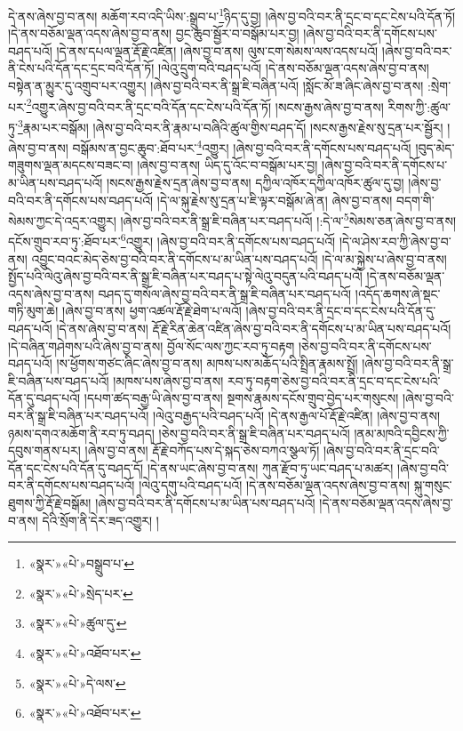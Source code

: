 དེ་ནས་ཞེས་བྱ་བ་ནས། མཆོག་རབ་འདི་ཡིས་:སྒྲུབ་པ་\footnote{«སྣར་»«པེ་»བསྒྲུབ་པ་}ཉིད་དུ་བྱ། །ཞེས་བྱ་བའི་བར་ནི་དྲང་བ་དང་ངེས་པའི་དོན་ཏོ། །དེ་ནས་བཅོམ་ལྡན་འདས་ཞེས་བྱ་བ་ནས། བྱང་ཆུབ་སྦྱོར་བ་བསྒོམ་པར་བྱ། །ཞེས་བྱ་བའི་བར་ནི་དགོངས་པས་བཤད་པའོ། །དེ་ནས་དཔལ་ལྡན་རྡོ་རྗེ་འཛིན། །ཞེས་བྱ་བ་ནས། ལུས་ངག་སེམས་ལས་འདས་པའོ། །ཞེས་བྱ་བའི་བར་ནི་ངེས་པའི་དོན་དང་དྲང་བའི་དོན་ཏོ། །ལེའུ་དྲུག་བའི་བཤད་པའོ། །དེ་ནས་བཅོམ་ལྡན་འདས་ཞེས་བྱ་བ་ནས། བསྟེན་ན་མྱུར་དུ་འགྲུབ་པར་འགྱུར། །ཞེས་བྱ་བའི་བར་ནི་སྒྲ་ཇི་བཞིན་པའོ། །སློང་མོ་ཟ་ཞིང་ཞེས་བྱ་བ་ནས། :སྲེག་པར་\footnote{«སྣར་»«པེ་»སྲེད་པར་}འགྱུར་ཞེས་བྱ་བའི་བར་ནི་དྲང་བའི་དོན་དང་ངེས་པའི་དོན་ཏོ། །སངས་རྒྱས་ཞེས་བྱ་བ་ནས། རིགས་ཀྱི་:ཚུལ་ཏུ་\footnote{«སྣར་»«པེ་»ཚུལ་དུ་}རྣམ་པར་བསྒོམ། །ཞེས་བྱ་བའི་བར་ནི་རྣམ་པ་བཞིའི་ཚུལ་གྱིས་བཤད་དོ། །སངས་རྒྱས་རྗེས་སུ་དྲན་པར་སྦྱོར། །ཞེས་བྱ་བ་ནས། བསྒོམས་ན་བྱང་ཆུབ་:ཐོབ་པར་\footnote{«སྣར་»«པེ་»འཐོབ་པར་}འགྱུར། །ཞེས་བྱ་བའི་བར་ནི་དགོངས་པས་བཤད་པའོ། །བུད་མེད་གཟུགས་ལྡན་མདངས་བཟང་བ། །ཞེས་བྱ་བ་ནས། ཡིད་དུ་འོང་བ་བསྒོམ་པར་བྱ། །ཞེས་བྱ་བའི་བར་ནི་དགོངས་པ་མ་ཡིན་པས་བཤད་པའོ། །སངས་རྒྱས་རྗེས་དྲན་ཞེས་བྱ་བ་ནས། དཀྱིལ་འཁོར་དཀྱིལ་འཁོར་ཚུལ་དུ་བྱ། །ཞེས་བྱ་བའི་བར་ནི་དགོངས་པས་བཤད་པའོ། །དེ་ལ་སྐུ་རྗེས་སུ་དྲན་པ་ཇི་ལྟར་བསྒོམ་ཞེ་ན། ཞེས་བྱ་བ་ནས། བདག་གི་སེམས་ཀྱང་དེ་འདྲར་འགྱུར། །ཞེས་བྱ་བའི་བར་ནི་སྒྲ་ཇི་བཞིན་པར་བཤད་པའོ། །:དེ་ལ་\footnote{«སྣར་»«པེ་»དེ་ལས་}སེམས་ཅན་ཞེས་བྱ་བ་ནས། དངོས་གྲུབ་རབ་ཏུ་:ཐོབ་པར་\footnote{«སྣར་»«པེ་»འཐོབ་པར་}འགྱུར། །ཞེས་བྱ་བའི་བར་ནི་དགོངས་པས་བཤད་པའོ། །དེ་ལ་ཤེས་རབ་ཀྱི་ཞེས་བྱ་བ་ནས། འབྱུང་བའང་མེད་ཅེས་བྱ་བའི་བར་ནི་དགོངས་པ་མ་ཡིན་པས་བཤད་པའོ། །དེ་ལ་མ་སྐྱེས་པ་ཞེས་བྱ་བ་ནས། སྤྱོད་པའི་ལེའུ་ཞེས་བྱ་བའི་བར་ནི་སྒྲ་ཇི་བཞིན་པར་བཤད་པ་སྟེ་ལེའུ་བདུན་པའི་བཤད་པའོ། །དེ་ནས་བཅོམ་ལྡན་འདས་ཞེས་བྱ་བ་ནས། བཤད་དུ་གསོལ་ཞེས་བྱ་བའི་བར་ནི་སྒྲ་ཇི་བཞིན་པར་བཤད་པའོ། །འདོད་ཆགས་ཞེ་སྡང་གཏི་མུག་ཆེ། །ཞེས་བྱ་བ་ནས། ཕྱག་འཚལ་རྡོ་རྗེ་ཐེག་པ་ལའོ། །ཞེས་བྱ་བའི་བར་ནི་དྲང་བ་དང་ངེས་པའི་དོན་དུ་བཤད་པའོ། །དེ་ནས་ཞེས་བྱ་བ་ནས། རྡོ་རྗེ་རིན་ཆེན་འཛིན་ཞེས་བྱ་བའི་བར་ནི་དགོངས་པ་མ་ཡིན་པས་བཤད་པའོ། །དེ་བཞིན་གཤེགས་པའི་ཞེས་བྱ་བ་ནས། བྱོལ་སོང་ལས་ཀྱང་རབ་ཏུ་བརྟག །ཅེས་བྱ་བའི་བར་ནི་དགོངས་པས་བཤད་པའོ། །ས་ཕྱོགས་གཙང་ཞིང་ཞེས་བྱ་བ་ནས། མཁས་པས་མཆོད་པའི་སྤྲིན་རྣམས་སྤྲོ། །ཞེས་བྱ་བའི་བར་ནི་སྒྲ་ཇི་བཞིན་པས་བཤད་པའོ། །མཁས་པས་ཞེས་བྱ་བ་ནས། རབ་ཏུ་བརྟག་ཅེས་བྱ་བའི་བར་ནི་དྲང་བ་དང་ངེས་པའི་དོན་དུ་བཤད་པའོ། །དཔག་ཚད་བརྒྱ་ཡི་ཞེས་བྱ་བ་ནས། སྔགས་རྣམས་དངོས་གྲུབ་བྱེད་པར་གསུངས། །ཞེས་བྱ་བའི་བར་ནི་སྒྲ་ཇི་བཞིན་པར་བཤད་པའོ། །ལེའུ་བརྒྱད་པའི་བཤད་པའོ། །དེ་ནས་རྒྱལ་པོ་རྡོ་རྗེ་འཛིན། །ཞེས་བྱ་བ་ནས། ཉམས་དགའ་མཆོག་ནི་རབ་ཏུ་བཤད། །ཅེས་བྱ་བའི་བར་ནི་སྒྲ་ཇི་བཞིན་པར་བཤད་པའོ། །ནམ་མཁའི་དབྱིངས་ཀྱི་དབུས་གནས་པར། །ཞེས་བྱ་བ་ནས། རྡོ་རྗེ་བཀོད་པས་དེ་སྐད་ཅེས་བཀའ་སྩལ་ཏོ། །ཞེས་བྱ་བའི་བར་ནི་དྲང་བའི་དོན་དང་ངེས་པའི་དོན་དུ་བཤད་དོ། །དེ་ནས་ཡང་ཞེས་བྱ་བ་ནས། ཀུན་རྫོབ་ཏུ་ཡང་བཤད་པ་མཚར། །ཞེས་བྱ་བའི་བར་ནི་དགོངས་པས་བཤད་པའོ། །ལེའུ་དགུ་པའི་བཤད་པའོ། །དེ་ནས་བཅོམ་ལྡན་འདས་ཞེས་བྱ་བ་ནས། སྐུ་གསུང་ཐུགས་ཀྱི་རྡོ་རྗེ་བསྒོམ། །ཞེས་བྱ་བའི་བར་ནི་དགོངས་པ་མ་ཡིན་པས་བཤད་པའོ། །དེ་ནས་བཅོམ་ལྡན་འདས་ཞེས་བྱ་བ་ནས། དེའི་སྲོག་ནི་དེར་ཟད་འགྱུར། །
